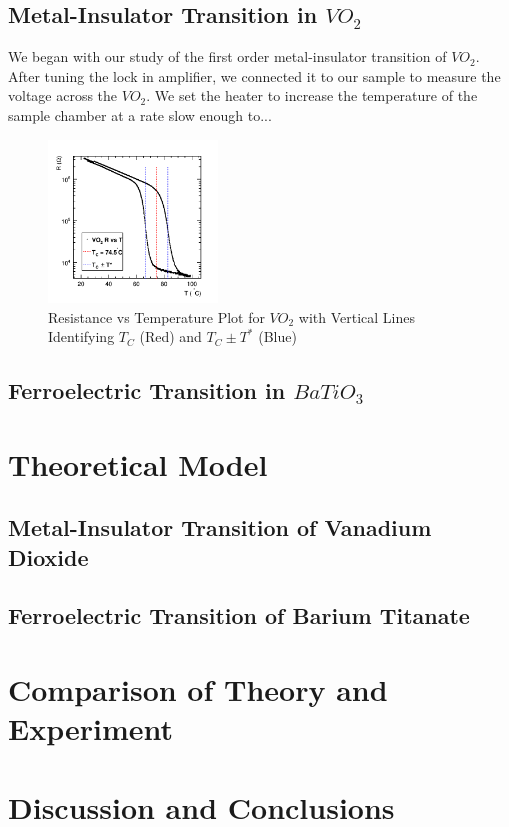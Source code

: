 \documentclass[%
 reprint,
 amsmath,amssymb,
 aps,
 pra,
]{revtex4-1}
\begin{document}
\subsection{Metal-Insulator Transition in $VO_{2}$}
We began with our study of the first order metal-insulator transition of $VO_{2}$. After tuning the lock in amplifier, we connected it to our sample to measure the voltage across the $VO_{2}$. We set the heater to increase the temperature of the sample chamber at a rate slow enough to...
\begin{figure}[H]
	\centering
	\includegraphics[width=0.4\textwidth]{VO2_RvT_withTC.png}
	\caption{Resistance vs Temperature Plot for $VO_{2}$ with Vertical Lines Identifying $T_{C}$ (Red) and $T_{C} \pm T^{*}$ (Blue)}
	\label{Fig:RvT1}
\end{figure}
\subsection{Ferroelectric Transition in $BaTiO_{3}$}

\section{Theoretical Model}

\subsection{Metal-Insulator Transition of Vanadium Dioxide}

\subsection{Ferroelectric Transition of Barium Titanate}

\section{Comparison of Theory and Experiment}

\section{Discussion and Conclusions}
\end{document}
